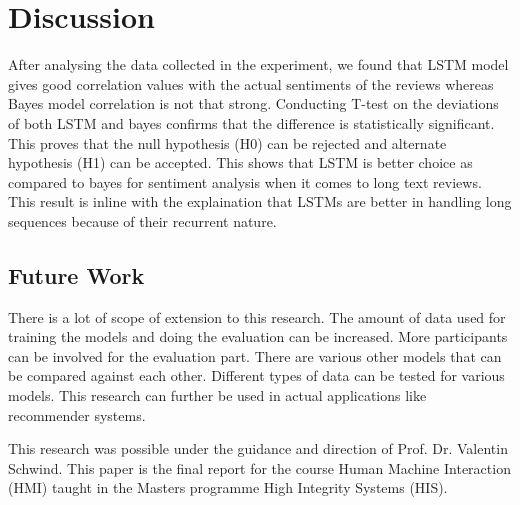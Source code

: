 \documentclass[sigplan,screen]{acmart}
\begin{document}
\section{Discussion}
After analysing the data collected in the experiment, we found that LSTM model gives good correlation values with the actual sentiments of the reviews whereas Bayes model correlation is not that strong. Conducting T-test on the deviations of both LSTM and bayes confirms that the difference is statistically significant. This proves that the null hypothesis (H0) can be rejected and alternate hypothesis (H1) can be accepted. This shows that LSTM is better choice as compared to bayes for sentiment analysis when it comes to long text reviews. This result is inline with the explaination that LSTMs are better in handling long sequences because of their recurrent nature.

\subsection{Future Work}
There is a lot of scope of extension to this research. The amount of data used for training the models and doing the evaluation can be increased. More participants can be involved for the evaluation part. There are various other models that can be compared against each other. Different types of data can be tested for various models. This research can further be used in actual applications like recommender systems. 



\begin{acks}
This research was possible under the guidance and direction of Prof. Dr. Valentin Schwind. This paper is the final report for the course Human Machine Interaction (HMI) taught in the Masters programme High Integrity Systems (HIS).
\end{acks}


\end{document}
